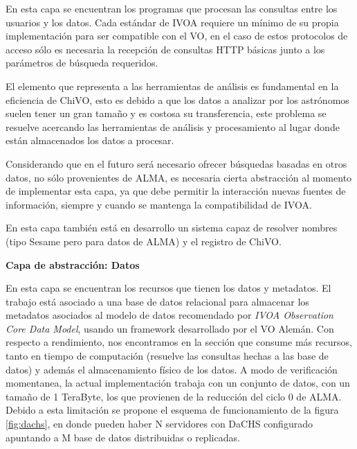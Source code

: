 En esta capa se encuentran los programas que procesan las consultas entre los
usuarios y los datos.
Cada estándar de IVOA requiere un mínimo de su propia implementación para ser
compatible con el VO, en el caso de estos protocolos de acceso sólo es necesaria la
recepción de consultas HTTP básicas junto a los parámetros de búsqueda requeridos.

El elemento que representa a las herramientas de análisis es fundamental en la
eficiencia de ChiVO, esto es debido a que los datos a analizar por los astrónomos
suelen tener un gran tamaño y es costosa su transferencia, este problema se
resuelve acercando las herramientas de análisis y procesamiento al lugar donde están
almacenados los datos a procesar.

Considerando que en el futuro será necesario ofrecer búsquedas
basadas en otros datos, no sólo provenientes de ALMA, es necesaria cierta
abstracción al momento de implementar esta capa, ya que debe permitir la interacción
nuevas fuentes de información, siempre y cuando se mantenga la compatibilidad
de IVOA.

En esta capa también está en desarrollo un sistema capaz de resolver nombres
(tipo Sesame pero para datos de ALMA) y el registro de ChiVO.

\textbf{Capa de abstracción: Datos}

En esta capa se encuentran los recursos que tienen los datos y metadatos.
El trabajo está asociado a una base de datos relacional para almacenar los
metadatos asociados al modelo de datos recomendado por \emph{IVOA Observation Core
Data Model}, usando un framework desarrollado por el VO Alemán.
Con respecto a rendimiento, nos encontramos en la sección que consume más
recursos, tanto en tiempo de computación (resuelve las consultas hechas a las base
de datos) y además el almacenamiento físico de los datos.
A modo de verificación momentanea,
la actual implementación trabaja con un conjunto de datos, con un tamaño
de 1 TeraByte, los que provienen de la reducción del ciclo 0 de ALMA.
Debido a esta limitación se propone
el esquema de funcionamiento de la figura \ref{fig:dachs}, en donde pueden haber N
servidores con DaCHS configurado apuntando a M base de datos distribuidas o replicadas.

